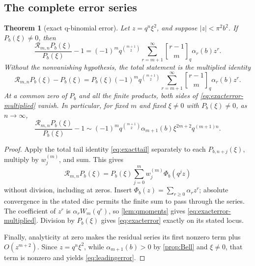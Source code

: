 \documentclass[11pt]{article}
\newtheorem{theorem}{Theorem}[section]
\theoremstyle{definition}
\theoremstyle{remark}
\newcommand{\abs}[1]{\left\lvert #1\right\rvert}
\newcommand{\qbinom}[2]{\genfrac{[}{]}{0pt}{}{#1}{#2}_{q}}
\begin{document}
\subsection{The complete error series}

\begin{theorem}[exact q-binomial error]
\label{thm:exacterror}
Let \(z=q^n\xi^2\), and suppose \(\abs z<\pi^2b^2\).  If
\(P_b(\xi)\ne0\), then
\begin{equation}
 \frac{\mathcal R_{m,n}P_b(\xi)}{P_b(\xi)}-1
 =(-1)^m q^{\binom{m+1}{2}}
 \sum_{r=m+1}^{\infty}
 \qbinom{r-1}{m}\alpha_r(b)z^r.
 \label{eq:exacterror}
\end{equation}
Without the nonvanishing hypothesis, the total statement is the multiplied
identity
\begin{equation}
 \mathcal R_{m,n}P_b(\xi)-P_b(\xi)
 =P_b(\xi)(-1)^m q^{\binom{m+1}{2}}
 \sum_{r=m+1}^{\infty}
 \qbinom{r-1}{m}\alpha_r(b)z^r.                         \label{eq:exacterror-multiplied}
\end{equation}
At a common zero of \(P_b\) and all the finite products, both sides of
\eqref{eq:exacterror-multiplied} vanish.  In particular, for fixed
\(m\) and fixed \(\xi\ne0\) with \(P_b(\xi)\ne0\), as \(n\to\infty\),
\begin{equation}
 \frac{\mathcal R_{m,n}P_b(\xi)}{P_b(\xi)}-1
 \sim (-1)^m q^{\binom{m+1}{2}}
 \alpha_{m+1}(b)\xi^{2m+2}q^{(m+1)n}.
 \label{eq:leadingerror}
\end{equation}
\end{theorem}

\begin{proof}
Apply the total tail identity \eqref{eq:exacttail} separately to each
\(P_{b,n+j}(\xi)\), multiply by \(w_j^{(m)}\), and sum.  This gives
\[
 \mathcal R_{m,n}P_b(\xi)
 =P_b(\xi)\sum_{j=0}^m w_j^{(m)}\Phi_b(q^jz)
\]
without division, including at zeros.  Insert
\(\Phi_b(z)=\sum_{r\geq0}\alpha_rz^r\); absolute convergence in the stated
disc permits the finite sum to pass through the series.  The coefficient of
\(z^r\) is \(\alpha_rW_m(q^r)\), so \cref{lem:qmoments} gives
\eqref{eq:exacterror-multiplied}.  Division by \(P_b(\xi)\) gives
\eqref{eq:exacterror} exactly on its stated locus.

Finally, analyticity at zero makes the residual series its first nonzero term
plus \(O(z^{m+2})\).  Since \(z=q^n\xi^2\), while
\(\alpha_{m+1}(b)>0\) by \cref{prop:Bell} and \(\xi\ne0\), that term is
nonzero and yields \eqref{eq:leadingerror}.
\end{proof}
\end{document}
